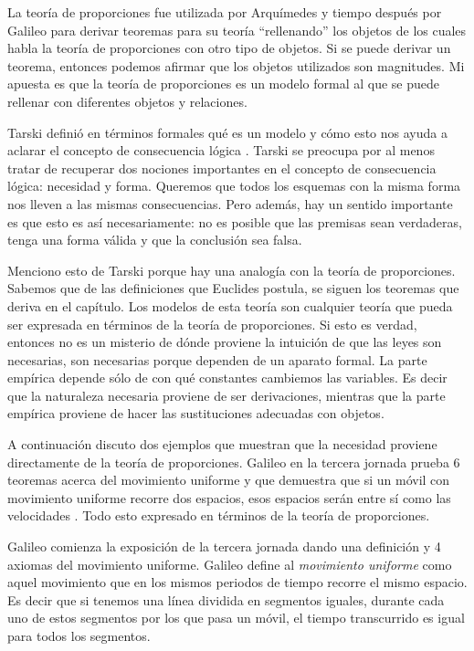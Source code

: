 La teoría de proporciones fue utilizada por Arquímedes y tiempo después por Galileo para derivar teoremas para su teoría ``rellenando'' los objetos de los cuales habla la teoría de proporciones con otro tipo de objetos. Si se puede derivar un teorema, entonces podemos afirmar que los objetos utilizados son magnitudes. Mi apuesta es que la teoría de proporciones es un modelo formal al que se puede rellenar con diferentes objetos y relaciones.

Tarski definió en términos formales qué es un modelo y cómo esto nos ayuda a aclarar el concepto de consecuencia lógica \cite{Tarski1956}. Tarski se preocupa por al menos tratar de recuperar dos nociones importantes en el concepto de consecuencia lógica: necesidad y forma. \cite{Torrente2000} Queremos que todos los esquemas con la misma forma nos lleven a las mismas consecuencias. Pero además, hay un sentido importante es que esto es así necesariamente: no es posible que las premisas sean verdaderas, tenga una forma válida y que la conclusión sea falsa.

Menciono esto de Tarski porque hay una analogía con la teoría de proporciones. Sabemos que de las definiciones que Euclides postula, se siguen los teoremas que deriva en el capítulo. Los modelos de esta teoría son cualquier teoría que pueda ser expresada en términos de la teoría de proporciones. Si esto es verdad, entonces no es un misterio de dónde proviene la intuición de que las leyes son necesarias, son necesarias porque dependen de un aparato formal. La parte empírica depende sólo de con qué constantes cambiemos las variables. Es decir que la naturaleza necesaria proviene de ser derivaciones, mientras que la parte empírica proviene de hacer las sustituciones adecuadas con objetos.

A continuación discuto dos ejemplos que muestran que la necesidad proviene directamente de la teoría de proporciones. Galileo en la tercera jornada prueba 6 teoremas acerca del movimiento uniforme y que demuestra que si un móvil con movimiento uniforme recorre dos espacios, esos espacios serán entre sí como las velocidades \cite[p. 215]{galtre}. Todo esto expresado en términos de la teoría de proporciones.

Galileo comienza la exposición de la tercera jornada dando una definición y 4 axiomas del movimiento uniforme. Galileo define al \textit{movimiento uniforme} como aquel movimiento que en los mismos periodos de tiempo recorre el mismo espacio. Es decir que si tenemos una línea dividida en segmentos iguales, durante cada uno de estos segmentos por los que pasa un móvil, el tiempo transcurrido es igual para todos los segmentos.

